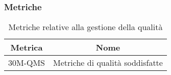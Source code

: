 \subsubsection{Metriche}
\begin{table}[h]
	\centering
	\begin{tabular}{|c|c|}
		\hline
		\textbf{Metrica} & \textbf{Nome}                   \\
		\hline
		30M-QMS          & Metriche di qualità soddisfatte \\
		\hline
	\end{tabular}
	\caption{Metriche relative alla gestione della qualità}
	\label{tab:2}
\end{table}
